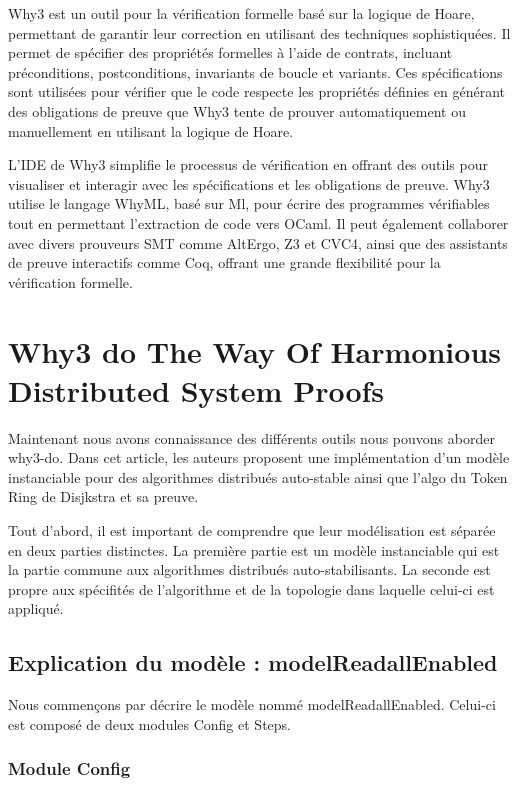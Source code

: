 \documentclass[11pt]{article}
\begin{document}
Why3 est un outil pour la vérification formelle basé sur la logique de Hoare, 
permettant de garantir leur correction en utilisant des techniques sophistiquées. 
Il permet de spécifier des propriétés formelles à l'aide de contrats, incluant préconditions, postconditions, 
invariants de boucle et variants. 
Ces spécifications sont utilisées pour vérifier que le code respecte les propriétés définies en générant des obligations de preuve que Why3
tente de prouver automatiquement ou manuellement en utilisant la logique de Hoare.

L'IDE de Why3 simplifie le processus de vérification en offrant des outils 
pour visualiser et interagir avec les spécifications et les obligations de preuve. 
Why3 utilise le langage WhyML, basé sur Ml, pour écrire des programmes vérifiables tout en permettant 
l'extraction de code vers OCaml. 
Il peut également collaborer avec divers prouveurs SMT comme AltErgo, Z3 et CVC4, 
ainsi que des assistants de preuve interactifs comme Coq, 
offrant une grande flexibilité pour la vérification formelle.

\section{Why3 do The Way Of Harmonious Distributed System Proofs}
\label{sec:org387140d}

Maintenant nous avons connaissance des différents outils nous pouvons aborder why3-do.
Dans cet article, les auteurs proposent une implémentation d'un modèle instanciable pour des algorithmes
distribués auto-stable ainsi que l'algo du Token Ring de Disjkstra et sa preuve.


Tout d'abord, il est important de comprendre que leur modélisation est séparée en deux parties distinctes. 
La première partie est un modèle instanciable qui est la partie commune aux algorithmes distribués
auto-stabilisants. 
La seconde est propre aux spécifités de l'algorithme et de la topologie dans laquelle celui-ci est appliqué. 


\subsection{Explication du modèle : modelReadallEnabled}
\label{sec:orgb82e974}

Nous commençons par décrire le modèle nommé modelReadallEnabled.
Celui-ci est composé de deux modules Config et Steps.


\subsubsection{Module Config}
\label{sec:orgb493e24}
\end{document}
